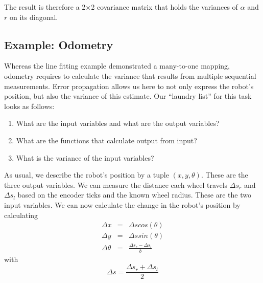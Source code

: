 The result is therefore a 2$\times$2 covariance matrix that holds the variances of $ \alpha$ and $ r$ on its diagonal.

\subsection{Example: Odometry}
Whereas the line fitting example demonstrated a many-to-one mapping, odometry requires to calculate the variance that results from multiple sequential measurements.  Error propagation allows us here to not only express the robot's position, but also the variance of this estimate. Our ``laundry list'' for this task looks as follows:
\begin{enumerate}
\item What are the input variables and what are the output variables?
\item What are the functions that calculate output from input?
\item What is the variance of the input variables?
\end{enumerate}

As usual, we describe the robot's position by a tuple $ (x,y,\theta)$. These are the three output variables. We can measure the distance each wheel travels $ \Delta s_r$ and $ \Delta s_l$ based on the encoder ticks and the known wheel radius. These are the two input variables. We can now calculate the change in the robot's position by calculating
\begin{eqnarray}
\Delta x  &=& \Delta s cos(\theta)\\
\Delta y  &=& \Delta s sin(\theta)\\
\Delta \theta &=& \frac{\Delta s_r-\Delta s_l}{b}
\end{eqnarray}
with
\begin{equation}
\Delta s=\frac{\Delta s_r + \Delta s_l}{2}
\end{equation}

